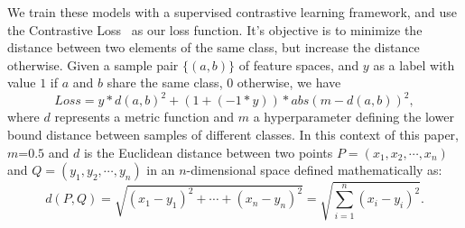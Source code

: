 We train these models with a supervised contrastive learning framework, and use the Contrastive Loss~\cite{chopra_learning_2005} as our loss function. It's objective is to minimize the distance between two elements of the same class, but increase the distance otherwise. Given a sample pair $\{(a, b)\}$ of feature spaces, and $y$ as a label with value $1$ if $a$ and $b$ share the same class, $0$ otherwise, we have
\begin{equation}
        Loss = y * d(a, b)^2 + (1 + (-1 * y)) * abs(m - d(a, b))^2,
\end{equation}
where $d$ represents a metric function and $m$ a hyperparameter defining the lower bound distance between samples of different classes. In this context of this paper, $m$=$0.5$ and $d$ is the Euclidean distance between two points $P = (x_1, x_2, \cdots, x_n)$ and $Q = (y_1, y_2, \cdots, y_n)$ in an $n$-dimensional space defined mathematically as:
\begin{equation}
d(P,Q)={\sqrt {(x_{1}-y_{1})^{2}+ \cdots +(x_{n}-y_{n})^{2}}} = \sqrt{ \sum_{i=1}^{n} (x_i - y_i)^2 }.
\end{equation}